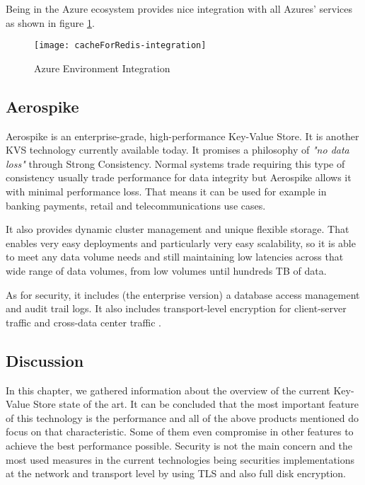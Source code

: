 Being in the Azure ecosystem provides nice integration with all Azures' services as shown in figure \ref{fig:azure_ecosystem}.

\begin{figure}[htbp]
	\centering
	{\texttt{[image: cacheForRedis-integration]}}%
	\caption{Azure Environment Integration}
	\label{fig:azure_ecosystem}
\end{figure}

\subsection{Aerospike}
\label{ssec:aerospike}

Aerospike \cite{aerospike:1} is an enterprise-grade, high-performance Key-Value Store. It is another \gls{KVS} technology currently available today. It promises a philosophy of \textit{"no data loss" } through Strong Consistency. Normal systems trade requiring this type of consistency usually trade performance for data integrity but Aerospike allows it  with minimal performance loss. That means it can be used for example in banking payments, retail and telecommunications use cases.

It also provides dynamic cluster management and unique flexible storage. That enables very easy deployments and particularly very easy scalability, so it is able to meet any data volume needs and still maintaining low latencies across that wide range of data volumes, from low volumes until hundreds \gls{TB} of data.

As for security, it includes (the enterprise version) a database access management and audit trail logs. It also includes transport-level encryption for client-server traffic and cross-data center traffic \cite{aerospike:2}.

\subsection{Discussion}
\label{ssec:s1_discussion}

In this chapter, we gathered information about the overview of the current Key-Value Store state of the art. It can be concluded that the most important feature of this technology is the performance and all of the above products mentioned do focus on that characteristic. Some of them even compromise in other features to achieve the best performance possible. Security is not the main concern and the most used measures in the current technologies being securities implementations at the network and transport level by using \gls{TLS} and also full disk encryption. 

